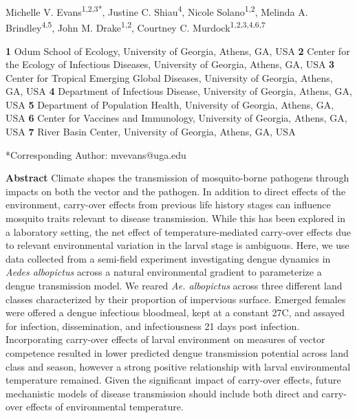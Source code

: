 \documentclass[12pt]{article}
\begin{document}
\setlength\parindent{0pt}%

{\Large
\textbf{}}

\bigskip

Michelle V. Evans\textsuperscript{1,2,3*},
Justine C. Shiau\textsuperscript{4},
Nicole Solano\textsuperscript{1,2},
Melinda A. Brindley\textsuperscript{4,5},
John M. Drake\textsuperscript{1,2},
Courtney C. Murdock\textsuperscript{1,2,3,4,6,7}
\smallskip


\textbf{1} Odum School of Ecology, University of Georgia, Athens, GA, USA
\newline
\textbf{2} Center for the Ecology of Infectious Diseases, University of Georgia, Athens, GA, USA
\newline
\textbf{3} Center for Tropical Emerging Global Diseases, University of Georgia, Athens, GA, USA
\newline
\textbf{4} Department of Infectious Disease, University of Georgia, Athens, GA, USA
\newline
\textbf{5} Department of Population Health, University of Georgia, Athens, GA, USA
\newline
\textbf{6} Center for Vaccines and Immunology, University of Georgia, Athens, GA, USA
\newline
\textbf{7} River Basin Center, University of Georgia, Athens, GA, USA
\smallskip

\noindent
*Corresponding Author: mvevans@uga.edu
\bigskip

\newpage

\textbf{Abstract} Climate shapes the transmission of mosquito-borne pathogens through impacts on both the vector and the pathogen.  In addition to direct effects of the environment, carry-over effects from previous life history stages can influence mosquito traits relevant to disease transmission. While this has been explored in a laboratory setting, the net effect of temperature-mediated carry-over effects due to relevant environmental variation in the larval stage is ambiguous. Here, we use data collected from a semi-field experiment investigating dengue dynamics in \textit{Aedes albopictus} across a natural environmental gradient to parameterize a dengue transmission model. We reared \textit{Ae. albopictus} across three different land classes characterized by their proportion of impervious surface. Emerged females were offered a dengue infectious bloodmeal, kept at a constant 27C, and assayed for infection, dissemination, and infectiousness 21 days post infection. Incorporating carry-over effects of larval environment on measures of vector competence resulted in lower predicted dengue transmission potential across land class and season, however a strong positive relationship with larval environmental temperature remained. Given the significant impact of carry-over effects, future mechanistic models of disease transmission should include both direct and carry-over effects of environmental temperature.
\end{document}
